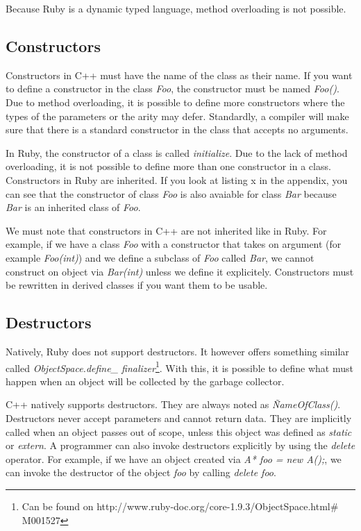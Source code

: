 \documentclass[10pt,a4paper,twocolumn]{article}
\begin{document}
Because Ruby is a dynamic typed language, method overloading is not possible.

\subsection{Constructors}

Constructors in C++ must have the name of the class as their name. If you want to define a constructor in the class \textit{Foo}, the constructor must be named \textit{Foo()}. Due to method overloading, it is possible to define more constructors where the types of the parameters or the arity may defer. Standardly, a compiler will make sure that there is a standard constructor in the class that accepts no arguments. 

In Ruby, the constructor of a class is called \textit{initialize}. Due to the lack of method overloading, it is not possible to define more than one constructor in a class. Constructors in Ruby are inherited. If you look at listing x in the appendix, you can see that the constructor of class \textit{Foo} is also avaiable for class \textit{Bar} because \textit{Bar} is an inherited class of \textit{Foo}.

We must note that constructors in C++ are not inherited like in Ruby. For example, if we have a class \textit{Foo} with a constructor that takes on argument (for example \textit{Foo(int)}) and we define a subclass of \textit{Foo} called \textit{Bar}, we cannot construct on object via \textit{Bar(int)} unless we define it explicitely. Constructors must be rewritten in derived classes if you want them to be usable.

\subsection{Destructors}

Natively, Ruby does not support destructors. It however offers something similar called \textit{ObjectSpace.define\_ finalizer}\footnote{Can be found on http://www.ruby-doc.org/core-1.9.3/ObjectSpace.html\# M001527}. With this, it is possible to define what must happen when an object will be collected by the garbage collector.

C++ natively supports destructors. They are always noted as \textit{\~NameOfClass()}. Destructors never accept parameters and cannot return data. They are implicitly called when an object passes out of scope, unless this object was defined as \textit{static} or \textit{extern}. A programmer can also invoke destructors explicitly by using the \textit{delete} operator. For example, if we have an object created via \textit{A* foo = new A();}, we can invoke the destructor of the object \textit{foo} by calling \textit{delete foo}.
\end{document}
